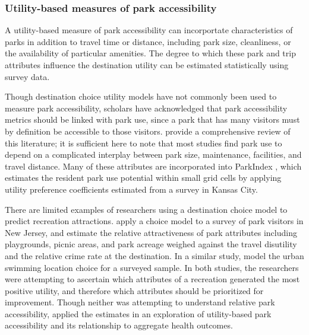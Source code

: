 \documentclass[3p, authoryear, review]{elsarticle} %
\begin{document}
\hypertarget{utility-based-measures-of-park-accessibility}{%
\subsubsection{Utility-based measures of park accessibility}\label{utility-based-measures-of-park-accessibility}}

A utility-based measure of park accessibility can incorportate characteristics of parks in addition to travel time or distance, including park size, cleanliness, or the availability of particular
amenities. The degree to which these park and trip attributes influence the
destination utility can be estimated statistically using survey data.

Though destination choice utility models have not commonly been used to measure
park accessibility, scholars have acknowledged that park accessibility metrics
should be linked with park use, since a park that has many visitors must by
definition be accessible to those visitors. \citet{McCormack2010} provide a
comprehensive review of this literature; it is sufficient here to note that most
studies find park use to depend on a complicated interplay between park size,
maintenance, facilities, and travel distance. Many of these attributes are
incorporated into ParkIndex \citep{Kaczynski2016}, which estimates the resident park
use potential within small grid cells by applying utility preference
coefficients estimated from a survey in Kansas City.

There are limited examples of researchers using a destination choice model to
predict recreation attractions. \citet{Kinnell2006} apply a choice model to a survey of
park visitors in New Jersey, and estimate the relative attractiveness of park
attributes including playgrounds, picnic areas, and park acreage weighed against
the travel disutility and the relative crime rate at the destination. In a
similar study, \citet{Meyerhoff2010} model the urban swimming location choice for a
surveyed sample. In both studies, the researchers were attempting to ascertain
which attributes of a recreation generated the most positive utility, and
therefore which attributes should be prioritized for improvement. Though neither
was attempting to understand relative park accessibility, \citet{macfarlaneNYC} applied
the \citet{Kinnell2006} estimates in an exploration of utility-based park accessibility
and its relationship to aggregate health outcomes.
\end{document}
